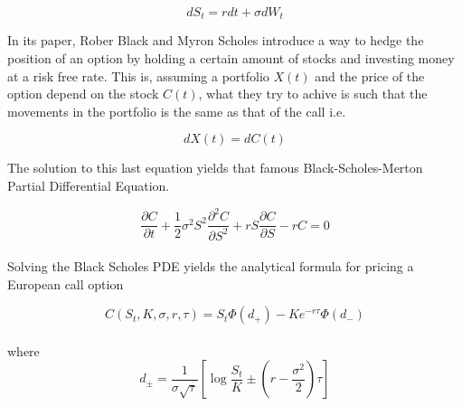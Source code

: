 \begin{equation}
    dS_t = r dt + \sigma dW_t 
\end{equation}

In its paper, Rober Black and Myron Scholes introduce a way to hedge the position of an option by holding a certain amount of stocks and investing money at a risk free rate. This is, assuming a portfolio $X(t)$ and the price of the option depend on the stock $C(t)$, what they try to achive is such that the movements in the portfolio is the same as that of the call i.e.

\begin{equation}
    dX(t) = dC(t)
\end{equation}

The solution to this last equation yields that famous Black-Scholes-Merton Partial Differential Equation.

\begin{equation}
    \frac{\partial C}{\partial t} + \frac{1}{2}\sigma^2 S^2 \frac{\partial^2 C}{\partial S^2} + rS\frac{\partial C}{\partial S} - rC = 0  
\end{equation}\\


Solving the Black Scholes PDE yields the analytical formula for pricing a European call option

\begin{equation}
    C(S_t,  K, \sigma, r, \tau) = S_t \Phi(d_+) - Ke^{-r\tau}\Phi(d_-)
\end{equation}\\

where
$$
    d_{\pm} = \frac{1}{\sigma\sqrt{\tau}}\left[\log\frac{S_t}{K} \pm (r - \frac{\sigma^2}{2})\tau\right]
$$

